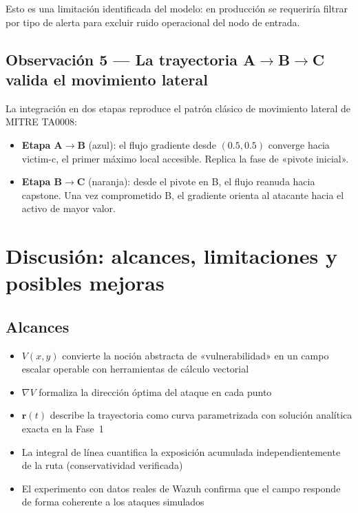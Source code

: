 \documentclass[12pt,a4paper]{article}
\newcommand{\grad}{\nabla}
\begin{document}
Esto es una limitación identificada del modelo: en producción
se requeriría filtrar por tipo de alerta para excluir ruido operacional
del nodo de entrada.

\subsection{Observación 5 --- La trayectoria A$\to$B$\to$C valida el movimiento lateral}

La integración en dos etapas reproduce el patrón clásico de movimiento
lateral de MITRE TA0008:
\begin{itemize}
  \item \textbf{Etapa A$\to$B} (azul): el flujo gradiente desde
    $(0.5,0.5)$ converge hacia victim-c, el primer máximo local
    accesible. Replica la fase de «pivote inicial».
  \item \textbf{Etapa B$\to$C} (naranja): desde el pivote en B, el
    flujo reanuda hacia capstone. Una vez comprometido B, el gradiente
    orienta al atacante hacia el activo de mayor valor.
\end{itemize}

\section{Discusión: alcances, limitaciones y posibles mejoras}

\subsection{Alcances}

\begin{itemize}
  \item $V(x,y)$ convierte la noción abstracta de «vulnerabilidad»
    en un campo escalar operable con herramientas de cálculo vectorial
  \item $\grad V$ formaliza la dirección óptima del ataque en cada punto
  \item $\mathbf{r}(t)$ describe la trayectoria como curva parametrizada
    con solución analítica exacta en la Fase~1
  \item La integral de línea cuantifica la exposición acumulada
    independientemente de la ruta (conservatividad verificada)
  \item El experimento con datos reales de Wazuh confirma que el campo
    responde de forma coherente a los ataques simulados
\end{itemize}
\end{document}
